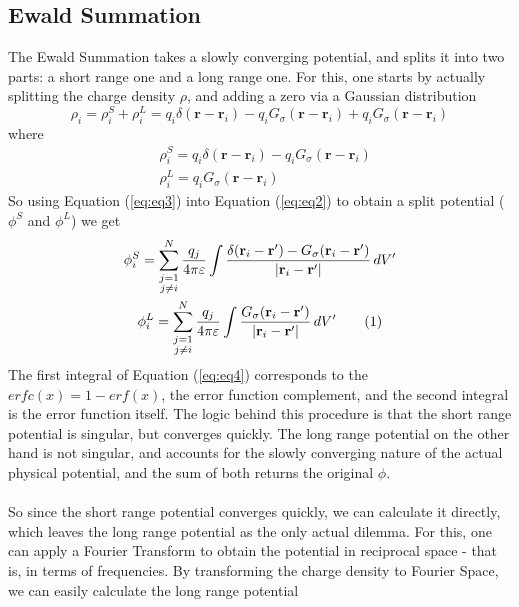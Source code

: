 \documentclass[a4paper, 12pt, notitlepage]{article}
\newcommand\numberthis{\addtocounter{equation}{1}\tag{\theequation}}
\begin{document}
\subsection*{Ewald Summation}
The Ewald Summation takes a slowly converging potential, and splits it into two parts: a short range one and a long range one. For this, one starts by actually splitting the charge density $\rho$, and adding a zero via a Gaussian distribution
\begin{equation}
\rho_i = \rho_i^S + \rho_i^L = q_i\delta(\mathbf{r} - \mathbf{r}_i) - q_i G_\sigma(\mathbf{r} - \mathbf{r}_i) + q_i G_\sigma(\mathbf{r} - \mathbf{r}_i)\label{eq:eq3}
\end{equation}
where
\begin{align*}
&\rho_i^S = q_i\delta(\mathbf{r} - \mathbf{r}_i) - q_i G_\sigma (\mathbf{r} - \mathbf{r}_i)\\
&\rho_i^L = q_i G_\sigma (\mathbf{r} - \mathbf{r}_i)
\end{align*}
So using Equation (\ref{eq:eq3}) into Equation (\ref{eq:eq2}) to obtain a split potential ($\phi^S$ and $\phi^L$) we get
\begin{gather*}
	\phi_i^S = \sum_{\substack{j=1\\j\neq i}}^{N}\frac{q_j}{4\pi\varepsilon}\int\frac{\delta(\mathbf{r}_i - \mathbf{r}') - G_\sigma (\mathbf{r}_i - \mathbf{r}')}{|\mathbf{r}_i - \mathbf{r}'|}\, dV'\\
	\phi_i^L = \sum_{\substack{j = 1\\j\neq i}}^{N}\frac{q_j}{4\pi\varepsilon} \int \frac{G_\sigma(\mathbf{r}_i - \mathbf{r}')}{|\mathbf{r}_i - \mathbf{r}'|}\, d V' \numberthis \label{eq:eq4}
\end{gather*}
The first integral of Equation (\ref{eq:eq4}) corresponds to the $erfc(x) = 1 - erf(x)$, the error function complement, and the second integral is the error function itself. The logic behind this procedure is that the short range potential is singular, but converges quickly. The long range potential on the other hand is not singular, and accounts for the slowly converging nature of the actual physical potential, and the sum of both returns the original $\phi$.\\\\
So since the short range potential converges quickly, we can calculate it directly, which leaves the long range potential as the only actual dilemma. For this, one can apply a Fourier Transform to obtain the potential in reciprocal space - that is, in terms of frequencies. By transforming the charge density to Fourier Space, we can easily calculate the long range potential
\end{document}
